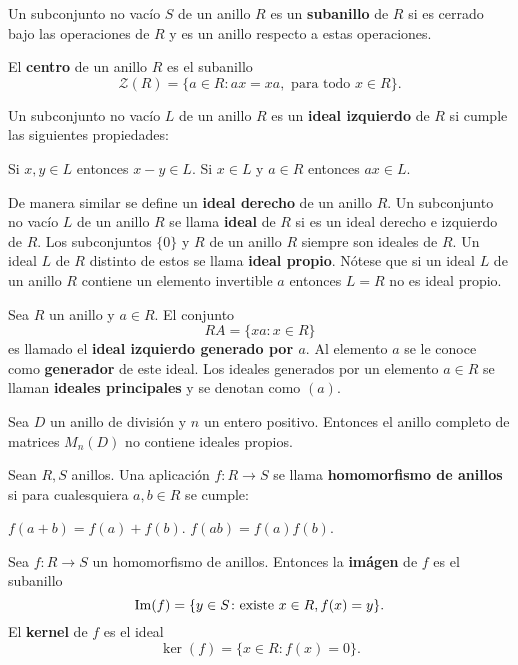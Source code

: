 \begin{definicion}
Un subconjunto no vacío $S$ de un anillo $R$ es un \textbf{subanillo} de $R$ si es cerrado bajo las operaciones de $R$ y es un anillo respecto a estas operaciones.
\end{definicion}
\begin{definicion}
El \textbf{centro} de un anillo $R$ es el subanillo \[ \mathcal{Z}(R) = \{a \in R \colon ax = xa, \mbox{ para todo } x \in R \}. \]
\end{definicion}
\begin{definicion}
Un subconjunto no vacío $L$ de un anillo $R$ es un \textbf{ideal izquierdo} de $R$ si cumple las siguientes propiedades:
\begin{bulletList}
\newItem Si $x,y \in L$ entonces $x-y \in L$.
\newItem Si $x \in L$ y $a \in R$ entonces $ax \in L$.
\end{bulletList}
\end{definicion}
De manera similar se define un \textbf{ideal derecho} de un anillo $R$. Un subconjunto no vacío $L$ de un anillo $R$ se llama \textbf{ideal} de $R$ si es un ideal derecho e izquierdo de $R$. 
Los subconjuntos $\{0\}$ y $R$ de un anillo $R$ siempre son ideales de $R$. Un ideal $L$ de $R$ distinto de estos se llama \textbf{ideal propio}. Nótese que si un ideal $L$ de un anillo $R$ contiene un elemento invertible $a$ entonces $L=R$ no es ideal propio. 
\begin{definicion}
Sea $R$ un anillo y $a \in R$. El conjunto \[ RA = \{ xa \colon x \in R \} \] es llamado  el \textbf{ideal izquierdo generado por $a$}. Al elemento $a$ se le conoce como \textbf{generador} de este ideal. Los ideales generados por un elemento $a \in R$ se llaman \textbf{ideales principales} y se denotan como $(a)$.
\end{definicion}
\begin{proposicion}
Sea $D$ un anillo de división y $n$ un entero positivo. Entonces el anillo completo de matrices $M_n(D)$ no contiene ideales propios.
\end{proposicion}
\begin{definicion}
Sean $R, S$ anillos. Una aplicación $f \colon R \to S$ se llama \textbf{homomorfismo de anillos} si para cualesquiera $a,b \in R$ se cumple:
\begin{bulletList}
\newItem $f(a+b) = f(a) +f(b)$.
\newItem $f(ab) = f(a)f(b)$.
\end{bulletList}
\end{definicion}
\begin{definicion}
Sea $f \colon R \to S$ un homomorfismo de anillos. Entonces la \textbf{imágen} de $f$ es el subanillo \[\operatorname{Im} (f) = \{ y \in S \colon \mbox{existe } x \in R, f(x)=y \}. \]
El \textbf{kernel} de $f$ es el ideal\[ \ker(f) = \{ x \in R \colon f(x) = 0 \}. \]
\end{definicion}
